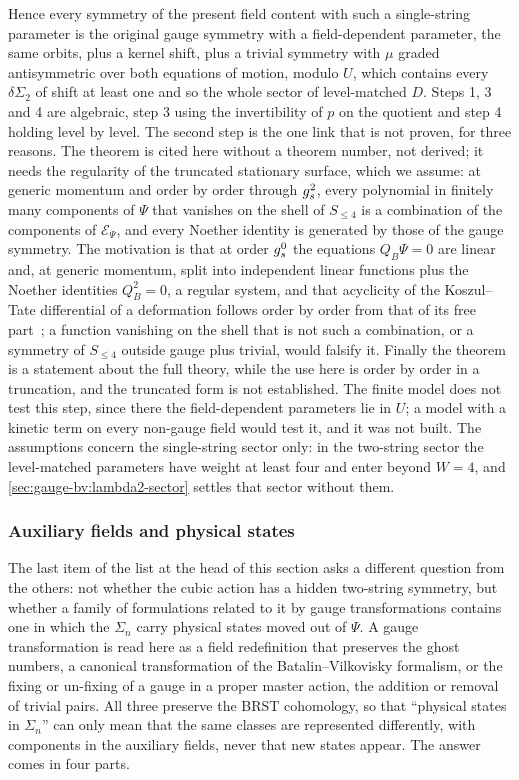 Hence every symmetry of the present field content with such a single-string parameter is the original gauge symmetry with a field-dependent parameter, the same orbits, plus a kernel shift, plus a trivial symmetry with $\mu$ graded antisymmetric over both equations of motion, modulo $U$, which contains every $\delta \Sigma_2$ of shift at least one and so the whole sector of level-matched $D$.
Steps 1, 3 and 4 are algebraic, step 3 using the invertibility of $p$ on the quotient and step 4 holding level by level.
The second step is the one link that is not proven, for three reasons.
The theorem is cited here without a theorem number, not derived; it needs the regularity of the truncated stationary surface, which we assume: at generic momentum and order by order through $g_s^2$, every polynomial in finitely many components of $\Psi$ that vanishes on the shell of $S_{\le 4}$ is a combination of the components of $\mathcal E_\Psi$, and every Noether identity is generated by those of the gauge symmetry.
The motivation is that at order $g_s^0$ the equations $Q_B \Psi = 0$ are linear and, at generic momentum, split into independent linear functions plus the Noether identities $Q_B^2 = 0$, a regular system, and that acyclicity of the Koszul--Tate differential of a deformation follows order by order from that of its free part~\cite{Barnich:2000:LocalBRSTCohomology}; a function vanishing on the shell that is not such a combination, or a symmetry of $S_{\le 4}$ outside gauge plus trivial, would falsify it.
Finally the theorem is a statement about the full theory, while the use here is order by order in a truncation, and the truncated form is not established.
The finite model does not test this step, since there the field-dependent parameters lie in $U$; a model with a kinetic term on every non-gauge field would test it, and it was not built.
The assumptions concern the single-string sector only: in the two-string sector the level-matched parameters have weight at least four and enter beyond $W = 4$, and \cref{sec:gauge-bv:lambda2-sector} settles that sector without them.

\subsubsection{Auxiliary fields and physical states}
\label{sec:gauge-bv:physical-states}

The last item of the list at the head of this section asks a different question from the others: not whether the cubic action has a hidden two-string symmetry, but whether a family of formulations related to it by gauge transformations contains one in which the $\Sigma_n$ carry physical states moved out of $\Psi$.
A gauge transformation is read here as a field redefinition that preserves the ghost numbers, a canonical transformation of the Batalin--Vilkovisky formalism, or the fixing or un-fixing of a gauge in a proper master action, the addition or removal of trivial pairs.
All three preserve the BRST cohomology, so that \enquote{physical states in $\Sigma_n$} can only mean that the same classes are represented differently, with components in the auxiliary fields, never that new states appear.
The answer comes in four parts.

